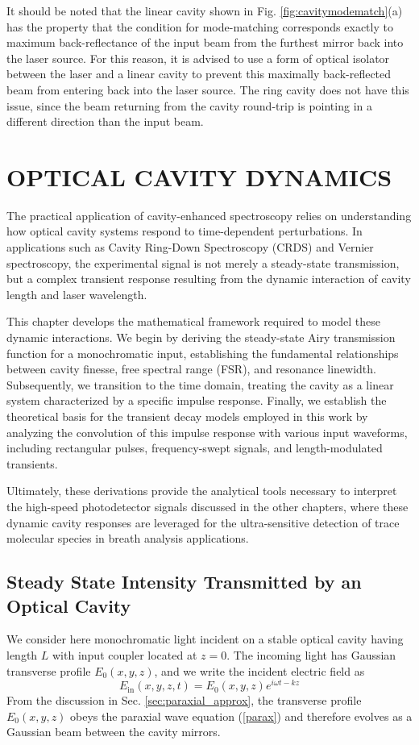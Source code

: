 It should be noted that the linear cavity shown in Fig. \ref{fig:cavitymodematch}(a) has the property that the condition for mode-matching corresponds exactly to maximum back-reflectance of the input beam from the furthest mirror back into the laser source. For this reason, it is advised to use a form of optical isolator between the laser and a linear cavity to prevent this maximally back-reflected beam from entering back into the laser source. The ring cavity does not have this issue, since the beam returning from the cavity round-trip is pointing in a different direction than the input beam.	


\chapter{OPTICAL CAVITY DYNAMICS} \label{chap:cav_dynamics}

The practical application of cavity-enhanced spectroscopy relies on understanding how optical cavity systems respond to time-dependent perturbations. In applications such as Cavity Ring-Down Spectroscopy (CRDS) and Vernier spectroscopy, the experimental signal is not merely a steady-state transmission, but a complex transient response resulting from the dynamic interaction of cavity length and laser wavelength.

This chapter develops the mathematical framework required to model these dynamic interactions. We begin by deriving the steady-state Airy transmission function for a monochromatic input, establishing the fundamental relationships between cavity finesse, free spectral range (FSR), and resonance linewidth. Subsequently, we transition to the time domain, treating the cavity as a linear system characterized by a specific impulse response. Finally, we establish the theoretical basis for the transient decay models employed in this work by analyzing the convolution of this impulse response with various input waveforms, including rectangular pulses, frequency-swept signals, and length-modulated transients.

Ultimately, these derivations provide the analytical tools necessary to interpret the high-speed photodetector signals discussed in the other chapters, where these dynamic cavity responses are leveraged for the ultra-sensitive detection of trace molecular species in breath analysis applications.

\section{Steady State Intensity Transmitted by an Optical Cavity} \label{sec:cav_transmission}
We consider here monochromatic light incident on a stable optical cavity having length $L$ with input coupler located at $z=0$. The incoming light has Gaussian transverse profile $E_0(x,y,z)$, and we write the incident electric field as
\begin{equation}
	E_\mathrm{in}(x,y,z,t) = E_0(x,y,z) e^{i\omega t - kz}
\end{equation}
From the discussion in Sec. \ref{sec:paraxial_approx}, the transverse profile $E_0(x,y,z)$ obeys the paraxial wave equation (\ref{parax}) and therefore evolves as a Gaussian beam between the cavity mirrors.

